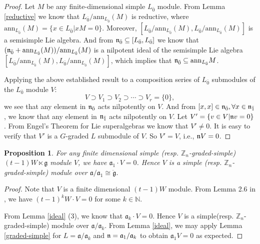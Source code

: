 \documentclass[1p]{elsarticle}
\numberwithin{equation}{section}
\def\fa{\mathfrak{a}}
\def\ddg{\ddot{\mathfrak{g}}}
\def\fg{\mathfrak{g}}
\def\bN{\mathbb{N}}
\def\bZ{\mathbb{Z}}
\def\ann{\mathrm{ann}}
\def\fl{\mathfrak{l}}
\newtheorem{prop}[theo]{Proposition}
\begin{document}
\begin{proof} Let $M$ be any finite-dimensional simple $L_{\bar 0}$ module. From Lemma \ref{reductive} we know that  $L_{\bar 0}/\ann_{L_{\bar 0}}(M)$ is reductive,  where $\ann_{L_{\bar 0}}(M)=\{x\in L_{\bar 0}|xM=0\}$. Moreover, $[L_{\bar 0}/\ann_{L_{\bar 0}}(M),L_{\bar 0}/\ann_{L_{\bar 0}}(M)]$ is a semisimple Lie algebra. And from $\frak{n}_{\bar 0}\subseteq [L_{\bar 0},L_{\bar 0}]$ we know that $(\frak{n}_{\bar 0}+\ann_{L_{\bar 0}}(M))/\ann_{L_{\bar 0}}(M)$ is a nilpotent ideal of the semisimple Lie algebra $[L_{\bar 0}/\ann_{L_{\bar 0}}(M),L_{\bar 0}/\ann_{L_{\bar 0}}(M)]$, which implies that $\frak{n}_{\bar 0}\subseteq \ann_{L_{\bar 0}} M$. 
	
	Applying the above established result to a composition series of $L_{\bar 0}$ submodules of the $L_{\bar 0}$ module $V$:
	$$ V\supset V_1\supset V_2\supset\cdots \supset V_r=\{0\},$$
	we see that any element in $\frak{n}_{\bar 0}$ acts nilpotently on $V$. And from $[x,x]\in \frak{n}_{\bar 0},\forall x\in \frak{n}_{\bar 1}$, we know that any element in $\frak{n}_{\bar 1}$ acts nilpotently on $V$. Let $V'=\{v\in V| \frak{n} v=0\}$. From Engel's Theorem for Lie superalgebras we know that $V'\ne 0$. It is easy to verify that $V'$ is a $G$-graded $L$ submodule of $V$. So $V'=V$, i.e., $\frak{n} V=0$.  \end{proof}

\begin{prop} \label{prop-17} For any finite dimensional simple (resp. $\bZ_n$-graded-simple) $(t-1)W\ltimes \fg$ module $V$, we have $\fa_1\cdot V=0$. Hence $V$ is a simple (resp. $\bZ_n$-graded-simple) module over  $\fa/\fa_1\cong\ddg$.\end{prop}

\begin{proof}Note that $V$ is a finite dimensional $(t-1)W$ module. From Lemma 2.6 in \cite{CLW}, we have $(t-1)^{k} W\cdot V=0$ for some $k\in \bN$.%

 From Lemma \ref{ideal} (3), we know that  $\fa_{k}\cdot V=0$.  Hence $V$ is a simple(resp. $\bZ_n$-graded-simple) module over $\fa/\fa_k$. From Lemma \ref{ideal}, we may apply Lemma \ref{graded-simple} for $L=\fa/\fa_k$ and $\frak{n}=\fa_1/\fa_k$ to obtain $\fa_1 V=0$ as expected.  \end{proof}
\end{document}
